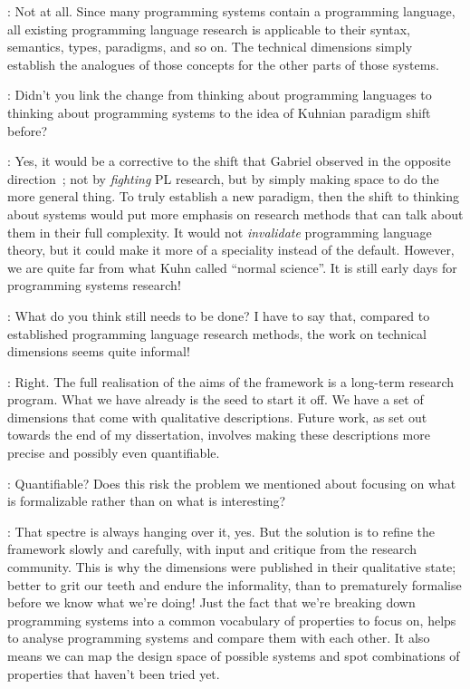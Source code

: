 \documentclass[runningheads]{llncs}
\newcommand{\T}{Tomas}
\newcommand{\J}{Joel}
\newcommand{\says}[2][gg]{\vspace{0.5em}\noindent\hangindent=0.5cm{\textsc{#1}}: #2}
\begin{document}
\says[\J]{Not at all. Since many programming systems contain a programming language, all existing programming language research is applicable to their syntax, semantics, types, paradigms, and so on. The technical dimensions simply establish the analogues of those concepts for the other parts of those systems.}

\says[\T]{Didn't you link the change from thinking about programming languages to thinking about programming systems to the idea of Kuhnian paradigm shift before?}

\says[\J]{Yes, it would be a corrective to the shift that Gabriel observed in the opposite direction\ \cite{rpg-2012-revolution}; not by \emph{fighting} PL research, but by simply making space to do the more general thing. To truly establish a new paradigm, then the shift to thinking about systems would put more emphasis on research methods that can talk about them in their full complexity. It would not \emph{invalidate} programming language theory, but it could make it more of a speciality instead of the default. However, we are quite far from what Kuhn called ``normal science''. It is still early days for programming systems research!}

\says[\T]{What do you think still needs to be done? I have to say that, compared to established programming language research methods, the work on technical dimensions seems quite informal!}

\says[\J]{Right. The full realisation of the aims of the framework is a long-term research program. What we have already is the seed to start it off. We have a set of dimensions that come with qualitative descriptions. Future work, as set out towards the end of my dissertation, involves making these descriptions more precise and possibly even quantifiable.}

\says[\T]{Quantifiable? Does this risk the problem we mentioned about focusing on what is formalizable rather than on what is interesting?}

\says[\J]{That spectre is always hanging over it, yes. But the solution is to refine the framework slowly and carefully, with input and critique from the research community. This is why the dimensions were published in their qualitative state; better to grit our teeth and endure the informality, than to prematurely formalise before we know what we're doing! Just the fact that we're breaking down programming systems into a common vocabulary of properties to focus on, helps to analyse programming systems and compare them with each other. It also means we can map the design space of possible systems and spot combinations of properties that haven't been tried yet.}
\end{document}
